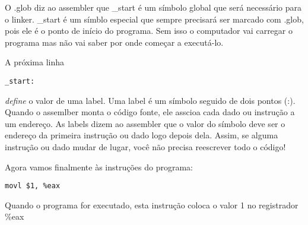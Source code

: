 O .glob diz ao assembler que \_{}start é um símbolo global que será necessário para o linker. \_{}start é um símblo especial que sempre precisará ser marcado com .glob, pois ele é o ponto de início do programa. Sem isso o computador vai carregar o programa mas não vai saber por onde começar a executá-lo.

A próxima linha

\begin{espacosimples}
\begin{verbatim}
_start:
\end{verbatim}
\end{espacosimples}

\emph{define} o valor de uma label. Uma label é um símbolo seguido de dois pontos (:). Quando o assemlber monta o código fonte, ele asscioa cada dado ou instrução a um endereço. As labels dizem ao assembler que o valor do símbolo deve ser o endereço da primeira instrução ou dado logo depois dela. Assim, se alguma instrução ou dado mudar de lugar, você não precisa reescrever todo o código!

Agora vamos finalmente às instruções do programa:

\begin{espacosimples}
\begin{verbatim}
movl $1, %eax
\end{verbatim}
\end{espacosimples}

Quando o programa for executado, esta instrução coloca o valor 1 no registrador \%{}eax